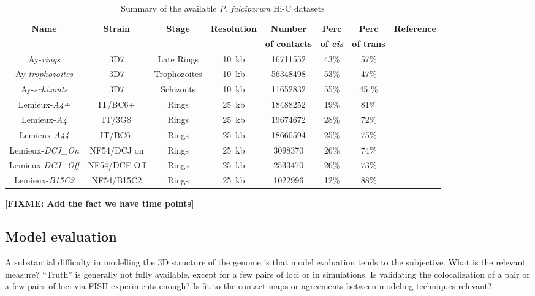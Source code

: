\documentclass[letterpaper,12pt]{article}
\newcommand{\fixme}[1]{\textbf{[FIXME: #1]}}
\begin{document}
\begin{table}
\scriptsize
\centering
\begin{tabular}{cccccccc}
\hline
\multirow{2}{*}{\textbf{Name}} & \multirow{2}{*}{\textbf{Strain}} &
\multirow{2}{*}{\textbf{Stage}} & \multirow{2}{*}{\textbf{Resolution}} &
\textbf{Number} & \textbf{Perc} & \textbf{Perc}& \multirow{2}{*}{\textbf{Reference}} \\
& & & & \textbf{of contacts} & \textbf{of \textit{cis}}& \textbf{of trans}& \\
\hline
\hline
Ay-\textit{rings} & 3D7 & Late Rings & 10~kb & 16711552 & 43\% & 57\% &  \cite{ay:three-dimensional} \\
Ay-\textit{trophozoites} & 3D7 & Trophozoites &10~kb & 56348498 & 53\% & 47\% & \cite{ay:three-dimensional} \\
Ay-\textit{schizonts} & 3D7 & Schizonts & 10~kb & 11652832 & 55\% & 45 \% & \cite{ay:three-dimensional} \\
Lemieux-\textit{A4+} & IT/BC6+ & Rings & 25~kb & 18488252 & 19\% & 81\% & \cite{lemieux:genome-wide} \\
Lemieux-\textit{A4} & IT/3G8 & Rings &  25~kb & 19674672 & 28\% & 72\% & \cite{lemieux:genome-wide}\\
Lemieux-\textit{A44} & IT/BC6- & Rings & 25~kb & 18660594 & 25\% & 75\% & \cite{lemieux:genome-wide}\\
Lemieux-\textit{DCJ\_On} & NF54/DCJ on & Rings & 25~kb & 3098370 & 26\% & 74\% &\cite{lemieux:genome-wide} \\
Lemieux-\textit{DCJ\_Off} & NF54/DCF Off & Rings & 25~kb & 2533470 & 26\% & 73\% &\cite{lemieux:genome-wide} \\
Lemieux-\textit{B15C2} & NF54/B15C2 & Rings & 25~kb &  1022996 & 12\% & 88\% & \cite{lemieux:genome-wide}\\
\hline
\end{tabular}
\caption{Summary of the available {\em P. falciparum} Hi-C datasets}
\end{table}



\fixme{Add the fact we have time points}

\subsection*{Model evaluation}

A substantial difficulty in modelling the 3D structure of the genome is that
model evaluation tends to the subjective. What is the relevant measure?
``Truth'' is generally not fully available, except for a few pairs of loci or
in simulations. Is validating the colocalization of a pair or a few pairs of
loci via FISH experiments enough? Is fit to the contact maps or agreements
between modeling techniques relevant? 
\end{document}
